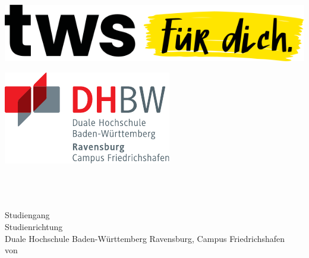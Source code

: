 \thispagestyle{plain}
\hypersetup{pageanchor=false}
\begin{titlepage}
\enlargethispage{4.0cm}
\sffamily 								%

\parbox{0.5\linewidth}{
\begin{flushleft}
	\includegraphics[width=0.4\linewidth]{images/Firmenlogo}\\[5ex]
\end{flushleft}
}
\parbox{0.5\linewidth}{
\begin{flushright}
	\includegraphics[width=0.4\linewidth]{images/DHBW_d_R_FN_46mm_4c}\\[5ex]
\end{flushright}
}
				

\begin{center}

{\fontsize{20.74pt}{24pt}\selectfont
\textbf{\titel}\\[1.5ex]}
{\fontsize{14pt}{17pt}\selectfont
\textbf{\untertitel}\\[5ex]}
{\fontsize{17pt}{20pt}\selectfont
\textbf{\arbeit}\\[2ex]}
{\fontsize{14pt}{17pt}\selectfont
Studiengang \studiengang\\[2ex]}
{\fontsize{12pt}{14pt}\selectfont
Studienrichtung \studienrichtung\\[1ex]
Duale Hochschule Baden-Württemberg Ravensburg, Campus Friedrichshafen\\[5ex]
von\\[1ex]
\autor\\[15ex]}


\end{center}


\end{titlepage}
